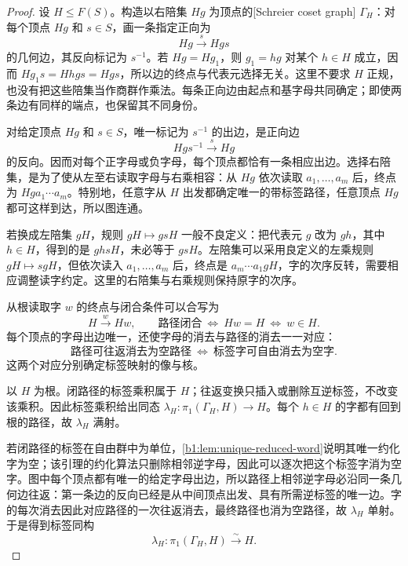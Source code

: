 \begin{proof}
	设 \(H\le F(S)\)。构造以右陪集 \(Hg\) 为顶点的[Schreier coset graph] \(\Gamma_H\)：对每个顶点 \(Hg\) 和 \(s\in S\)，画一条指定正向为
	\[
		Hg\xrightarrow{s}Hgs
	\]
	的几何边，其反向标记为 \(s^{-1}\)。若 \(Hg=Hg_1\)，则 \(g_1=hg\) 对某个 \(h\in H\) 成立，因而 \(Hg_1s=Hhgs=Hgs\)，所以边的终点与代表元选择无关。这里不要求 \(H\) 正规，也没有把这些陪集当作商群作乘法。每条正向边由起点和基字母共同确定；即使两条边有同样的端点，也保留其不同身份。

	对给定顶点 \(Hg\) 和 \(s\in S\)，唯一标记为 \(s^{-1}\) 的出边，是正向边
	\[
		Hgs^{-1}\xrightarrow{s}Hg
	\]
	的反向。因而对每个正字母或负字母，每个顶点都恰有一条相应出边。选择右陪集，是为了使从左至右读取字母与右乘相容：从 \(Hg\) 依次读取 \(a_1,\ldots,a_m\) 后，终点为 \(Hga_1\cdots a_m\)。特别地，任意字从 \(H\) 出发都确定唯一的带标签路径，任意顶点 \(Hg\) 都可这样到达，所以图连通。

	若换成左陪集 \(gH\)，规则 \(gH\mapsto gsH\) 一般不良定义：把代表元 \(g\) 改为 \(gh\)，其中 \(h\in H\)，得到的是 \(ghsH\)，未必等于 \(gsH\)。左陪集可以采用良定义的左乘规则 \(gH\mapsto sgH\)，但依次读入 \(a_1,\ldots,a_m\) 后，终点是 \(a_m\cdots a_1gH\)，字的次序反转，需要相应调整读字约定。这里的右陪集与右乘规则保持原字的次序。

	从根读取字 \(w\) 的终点与闭合条件可以合写为
	\[
		H\xrightarrow{w}Hw,\qquad \text{路径闭合}\ \Longleftrightarrow\ Hw=H\
		\Longleftrightarrow\ w\in H.
	\]
	每个顶点的字母出边唯一，还使字母的消去与路径的消去一一对应：
	\[
		\text{路径可往返消去为空路径} \ \Longleftrightarrow\
		\text{标签字可自由消去为空字}.
	\]
	这两个对应分别确定标签映射的像与核。

	以 \(H\) 为根。闭路径的标签乘积属于 \(H\)；往返变换只插入或删除互逆标签，不改变该乘积。因此标签乘积给出同态 \(\lambda_H:\pi_1(\Gamma_H,H)\rightarrow H\)。每个 \(h\in H\) 的字都有回到根的路径，故 \(\lambda_H\) 满射。

	若闭路径的标签在自由群中为单位，\cref{b1:lem:unique-reduced-word}说明其唯一约化字为空；该引理的约化算法只删除相邻逆字母，因此可以逐次把这个标签字消为空字。图中每个顶点都有唯一的给定字母出边，所以路径上相邻逆字母必沿同一条几何边往返：第一条边的反向已经是从中间顶点出发、具有所需逆标签的唯一边。字的每次消去因此对应路径的一次往返消去，最终路径也消为空路径，故 \(\lambda_H\) 单射。于是得到标签同构
	\begin{equation}\label{b1:eq:schreier-label-isomorphism}
		\lambda_H:\pi_1(\Gamma_H,H)\xrightarrow{\sim}H.
	\end{equation}


\end{proof}
